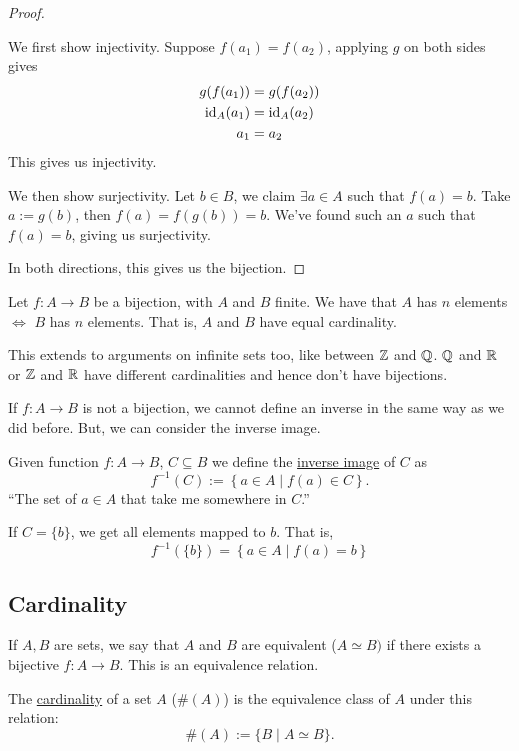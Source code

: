 \begin{proof}
\begin{description}
            We first show injectivity. Suppose $f(a_1) = f(a_2)$, applying $g$ on both sides gives
            \begin{align*}
                g(f(a_1))  & = g(f(a_2))  \\
                \operatorname{\mathrm{id}}_A(a_1) & = \operatorname{\mathrm{id}}_A(a_2) \\
                a_1        & = a_2
            \end{align*}
            This gives us injectivity.

            We then show surjectivity. Let $b\in B$, we claim $\exists a\in A$ such that $f(a) = b$. Take $a := g(b)$, then $f(a) = f(g(b)) = b$. We've found such an $a$ such that $f(a) = b$, giving us surjectivity.
    \end{description}
    In both directions, this gives us the bijection.
\end{proof}

\begin{remark}
    Let $f: A\to B$ be a bijection, with $A$ and $B$ finite. We have that $A$ has $n$ elements $\iff$ $B$ has $n$ elements. That is, $A$ and $B$ have equal cardinality.

    This extends to arguments on infinite sets too, like between $\mathbb Z$ and $\mathbb Q$. $\mathbb Q$ and $\mathbb R$ or $\mathbb Z$ and $\mathbb R$ have different cardinalities and hence don't have bijections.
\end{remark}

If $f: A\to B$ is not a bijection, we cannot define an inverse in the same way as we did before. But, we can consider the inverse image.

\begin{definition}
    Given function $f: A\to B$, $C\subseteq B$ we define the \ul{inverse image} of $C$ as
    \[f^{-1}(C) := \left\{ a\in A\mid f(a)\in C \right\}.\]
    ``The set of $a\in A$ that take me somewhere in $C$.''
\end{definition}

If $C = \{b\}$, we get all elements mapped to $b$. That is,
\[f^{-1}(\{b\}) = \left\{ a\in A\mid f(a) = b \right\}\]

\subsection{Cardinality}
\begin{definition}[Cardinality]
    If $A, B$ are sets, we say that $A$ and $B$ are equivalent ($A\simeq B)$ if there exists a bijective $f: A\to B$. This is an equivalence relation.

    The \ul{cardinality} of a set $A$ ($\#(A)$) is the equivalence class of $A$ under this relation:
    \[\#(A) := \{B\mid A\simeq B\}.\]
\end{definition}

